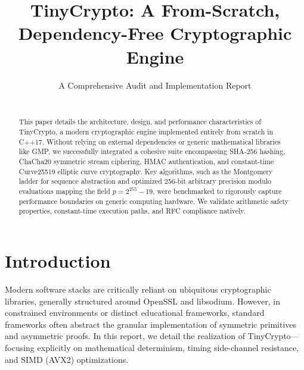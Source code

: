 \documentclass[10pt,twocolumn,letterpaper]{article}
\title{TinyCrypto: A From-Scratch, Dependency-Free Cryptographic Engine}
\author{A Comprehensive Audit and Implementation Report \\
\\
}
\begin{document}
\maketitle

\begin{abstract}
This paper details the architecture, design, and performance characteristics of TinyCrypto, a modern cryptographic engine implemented entirely from scratch in C++17. Without relying on external dependencies or generic mathematical libraries like GMP, we successfully integrated a cohesive suite encompassing SHA-256 hashing, ChaCha20 symmetric stream ciphering, HMAC authentication, and constant-time Curve25519 elliptic curve cryptography. Key algorithms, such as the Montgomery ladder for sequence abstraction and optimized 256-bit arbitrary precision modulo evaluations mapping the field $p = 2^{255} - 19$, were benchmarked to rigorously capture performance boundaries on generic computing hardware. We validate arithmetic safety properties, constant-time execution paths, and RFC compliance natively.
\end{abstract}

\section{Introduction}
Modern software stacks are critically reliant on ubiquitous cryptographic libraries, generally structured around OpenSSL and libsodium. However, in constrained environments or distinct educational frameworks, standard frameworks often abstract the granular implementation of symmetric primitives and asymmetric proofs. In this report, we detail the realization of TinyCrypto—focusing explicitly on mathematical determinism, timing side-channel resistance, and SIMD (AVX2) optimizations.
\end{document}
